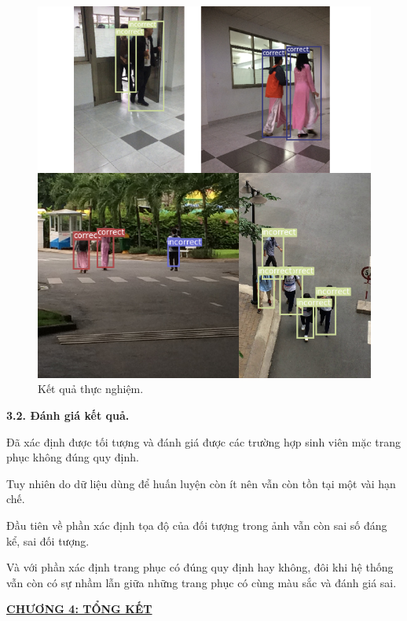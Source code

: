 \documentclass{report}
\begin{document}
\begin{figure}[h!]
	\includegraphics[scale=0.7]{test2.png}
	\caption{Kết quả thực nghiệm.}
\end{figure}




\bigskip
\changefontsizes{14pt}
\setlength{\parindent}{0.0cm}
\textbf{3.2. Đánh giá kết quả.}


\smallskip
\changefontsizes{13pt}
\setlength{\parindent}{1cm}

Đã xác định được tối tượng và đánh giá được các trường hợp sinh viên mặc trang phục không đúng quy định.

Tuy nhiên do dữ liệu dùng để huấn luyện còn ít nên vẫn còn tồn tại một vài hạn chế.

Đầu tiên về phần xác định tọa độ của đối tượng trong ảnh vẫn còn sai số đáng kể, sai đối tượng.

Và với phần xác định trang phục có đúng quy định hay không, đôi khi hệ thống vẫn còn có sự nhầm lẫn giữa những trang phục có cùng màu sắc và đánh giá sai.

\newpage
\changefontsizes{16pt}
\centerline{\textbf{\hyperlink{page.7}{CHƯƠNG 4: TỔNG KẾT}}}
\end{document}
